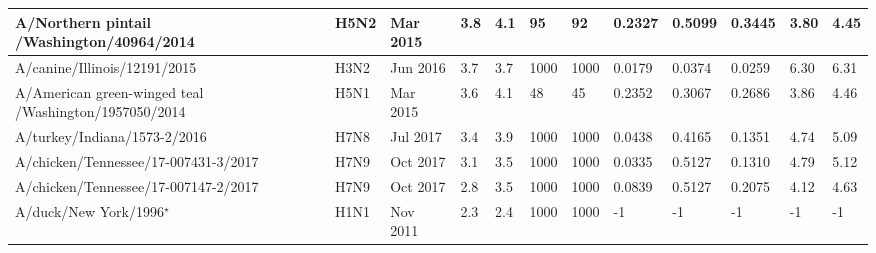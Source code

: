 \begin{tabular}{L{1.32in}|L{.35in}|L{.3in}|L{.3in}|L{.3in}|L{.35in}|L{.35in}|L{.35in}|L{.35in}|L{.32in}|L{.3in}|L{.3in}}
 A/Northern  pintail /Washington/40964/2014 &H5N2& Mar  2015 &3.8&4.1&95&92&0.2327&0.5099&0.3445&3.80&4.45\\\hline
 A/canine/Illinois/12191/2015 &H3N2& Jun  2016 &3.7&3.7&1000&1000&0.0179&0.0374&0.0259&6.30&6.31\\\hline
 A/American  green-winged  teal /Washington/1957050/2014 &H5N1& Mar  2015 &3.6&4.1&48&45&0.2352&0.3067&0.2686&3.86&4.46\\\hline
 A/turkey/Indiana/1573-2/2016 &H7N8& Jul  2017 &3.4&3.9&1000&1000&0.0438&0.4165&0.1351&4.74&5.09\\\hline
 A/chicken/Tennessee/17-007431-3/2017 &H7N9& Oct  2017 &3.1&3.5&1000&1000&0.0335&0.5127&0.1310&4.79&5.12\\\hline
 A/chicken/Tennessee/17-007147-2/2017 &H7N9& Oct  2017 &2.8&3.5&1000&1000&0.0839&0.5127&0.2075&4.12&4.63\\\hline
 A/duck/New  York/1996$^\star$ &H1N1& Nov  2011 &2.3&2.4&1000&1000&-1&-1&-1&-1&-1\\\hline
\end{tabular}